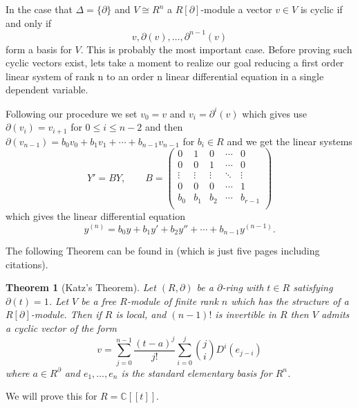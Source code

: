 \documentclass[12pt]{book}
\numberwithin{equation}{section}
\newtheorem{theorem}{Theorem}[subsection]
\theoremstyle{definition}
\theoremstyle{remark}
\newcommand{\CC}{\mathbb{C}}
\begin{document}
In the case that $\Delta = \lbrace \partial \rbrace$ and $V \cong R^n$ a $R[\partial]$-module a vector $v \in V$ is cyclic if and only if 
$$ v, \partial(v), \ldots, \partial^{n-1}(v) $$
form a basis for $V$. 
This is probably the most important case. 
Before proving such cyclic vectors exist, lets take a moment to realize our goal reducing a first order linear system of rank n to an order n linear differential equation in a single dependent variable. 

Following our procedure we set $v_0 = v$ and $v_i = \partial^i(v)$ which gives use $\partial(v_i) = v_{i+1}$ for $0 \leq i \leq n-2$ and then $\partial(v_{n-1}) = b_0v_0 +b_1v_1 + \cdots + b_{n-1} v_{n-1}$ for $b_i \in R$ and we get the linear systems 
$$ Y' = BY, \qquad B=\begin{pmatrix} 0 & 1 & 0&\cdots & 0 \\
0 & 0 & 1 &\cdots & 0 \\
\vdots & \vdots &\vdots & \ddots & \vdots \\
0& 0 & 0 & \cdots & 1 \\
b_0 & b_1 & b_2 & \cdots & b_{r-1} \\
\end{pmatrix}$$
which gives the linear differential equation 
$$ y^{(n)} = b_0 y+b_1y' + b_2 y''+ \cdots + b_{n-1}y^{(n-1)}.$$

The following Theorem can be found in \cite{Katz1987} (which is just five pages including citations). 
\begin{theorem}[Katz's Theorem]\label{T:katz}
	Let $(R,\partial)$ be a $\partial$-ring with $t\in R$ satisfying $\partial(t)=1$.
	Let $V$ be a free $R$-module of finite rank $n$ which has the structure of a $R[\partial]$-module. 
	Then if $R$ is local, and $(n-1)!$ is invertible in $R$ then $V$ admits a cyclic vector of the form
	$$ v = \sum_{j=0}^{n-1} \frac{(t-a)^j}{j!} \sum_{i=0}^j { j \choose i } D^i(e_{j-i}) $$
	where $a \in R^{\partial}$ and $e_1,\ldots,e_n$ is the standard elementary basis for $R^n$.
\end{theorem}
We will prove this for $R=\CC[[t]]$. 
\end{document}
